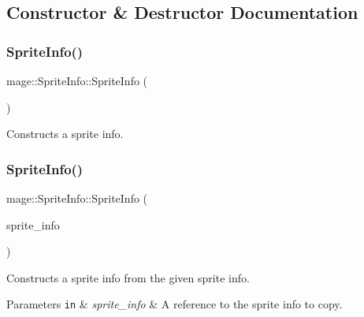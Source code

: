 \subsection{Constructor \& Destructor Documentation}
\hypertarget{structmage_1_1_sprite_info_a95544c5b70d30b273a482139c4299be0}{}\label{structmage_1_1_sprite_info_a95544c5b70d30b273a482139c4299be0} 
\subsubsection{\texorpdfstring{Sprite\+Info()}{SpriteInfo()}\hspace{0.1cm}{\footnotesize\ttfamily [1/3]}}
{\footnotesize\ttfamily mage\+::\+Sprite\+Info\+::\+Sprite\+Info (\begin{DoxyParamCaption}{ }\end{DoxyParamCaption})}

Constructs a sprite info. \hypertarget{structmage_1_1_sprite_info_a42bf55280335f8bc91b614145f766f51}{}\label{structmage_1_1_sprite_info_a42bf55280335f8bc91b614145f766f51} 
\subsubsection{\texorpdfstring{Sprite\+Info()}{SpriteInfo()}\hspace{0.1cm}{\footnotesize\ttfamily [2/3]}}
{\footnotesize\ttfamily mage\+::\+Sprite\+Info\+::\+Sprite\+Info (\begin{DoxyParamCaption}\item[{const \hyperlink{structmage_1_1_sprite_info}{Sprite\+Info} \&}]{sprite\+\_\+info }\end{DoxyParamCaption})\hspace{0.3cm}{\ttfamily [default]}}

Constructs a sprite info from the given sprite info.


\begin{DoxyParams}[1]{Parameters}
\mbox{\tt in}  & {\em sprite\+\_\+info} & A reference to the sprite info to copy. \\
\hline
\end{DoxyParams}
\hypertarget{structmage_1_1_sprite_info_ab1aaf7a0a3f3723b0836dd6e9ec6bc3e}{}\label{structmage_1_1_sprite_info_ab1aaf7a0a3f3723b0836dd6e9ec6bc3e} 
